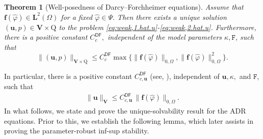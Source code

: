 \documentclass[11pt, reqno, a4paper, twoside]{article}
\newcommand{\bu}{\boldsymbol{u}}
\renewcommand{\bf}{\boldsymbol{f}}
\newcommand{\rF}{\mathtt{F}}
\newcommand{\rQ}{\mathrm{Q}}
\newcommand{\bL}{\mathbf{L}}
\newcommand{\bV}{\mathbf{V}}
\newtheorem{theorem}{Theorem}[section]
\numberwithin{equation}{section}
\numberwithin{remark}{section}
\numberwithin{figure}{section}
\numberwithin{table}{section}
\begin{document}
\begin{theorem}[Well-posedness of  Darcy--Forchheimer equations]\label{th:continuous-DF}
Assume that   $\bf(\hat{\varphi})\in \bL^2(\Omega)$ { for a fixed  $\hat{\varphi}\in \Psi.$}  Then there exists a unique  solution $(\bu,p)\in \bV\times\rQ$ to the problem \eqref{eq:weak,1.hat.u}-\eqref{eq:weak,2.hat.u}. Furthermore, there is a positive constant $C^{\mathsf{DF}}_{c},$ independent of the model parameters $\kappa, \rF$, such that 
\begin{equation*}
 \|(\bu, p )\|_{\bV\times\rQ}  \leq C^{\mathsf{DF}}_{c}\max \bigl\{\|\bf(\hat{\varphi})\|_{0,\Omega} ,\|\bf(\hat{\varphi})\|_{0,\Omega}^2\bigr\}.
    \end{equation*}
\end{theorem}
In particular, there is a positive constant ${C^{\mathsf{DF}}_{c,\bu}}$ (see, \cite[Equation~3.10]{dhpr_sinum26}), independent of   $\bu, \kappa,$ and $ \rF$, such that 
 \begin{align}\label{eq:u.estimate}
    \|\bu\|_{\bV}\leq {C^{\mathsf{DF}}_{c,\bu}}\,\|\bf(\hat{\varphi})\|_{0,\Omega} .\end{align}
    In what follows, we state and prove the unique-solvability result for the ADR equations. Prior to this, we establish the following {lemma}, which  later assists in proving the parameter-robust inf-sup stability. 
\end{document}
